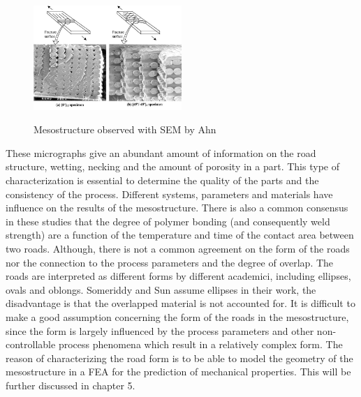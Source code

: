\begin{figure}[H]
    \centering
    \includegraphics[width=0.5\textwidth]{chapter_2/figures/AhnMeso.jpg}
    \caption{Mesostructure observed with SEM by Ahn} \cite{Ahn2002AnisotropicABS}
    \label{fig:AhnMeso}
\end{figure}

These micrographs give an abundant amount of information on the road structure, wetting, necking and the amount of porosity in a part. This type of characterization is essential to determine the quality of the parts and the consistency of the process. Different systems, parameters and materials have influence on the results of the mesostructure. There is also a common consensus in these studies that the degree of polymer bonding (and consequently weld strength) are a function of the temperature and time of the contact area between two roads. Although, there is not a common agreement on the form of the roads nor the connection to the process parameters and the degree of overlap. The roads are interpreted as different forms by different academici, including ellipses, ovals and oblongs. Someriddy \cite{Somireddy2018DevelopmentFDM} and Sun \cite{Sun2008} assume ellipses in their work, the disadvantage is that the overlapped material is not accounted for. 
It is difficult to make a good assumption concerning the form of the roads in the mesostructure, since the form is largely influenced by the process parameters and other non-controllable process phenomena which  result in a relatively complex form. The reason of characterizing the road form is to be able to model the geometry of the mesostructure in a FEA for the prediction of mechanical properties. This will be further discussed in chapter 5. 

